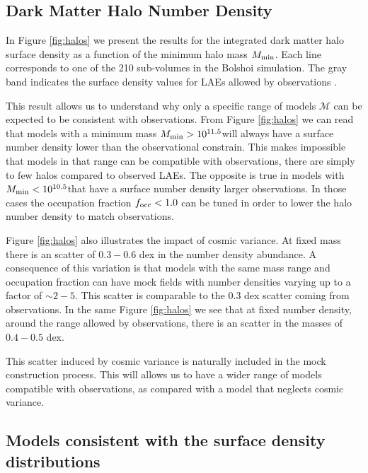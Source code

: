 \documentclass[usenatbib]{mn2e}
\newcommand{\hMsun}{{\ifmmode{h^{-1}{\rm
        {M_{\odot}}}}\else{$h^{-1}{\rm{M_{\odot}}}$}\fi}}
\begin{document}
\subsection{Dark Matter Halo Number Density}

In Figure \ref{fig:halos} we present the results for  the
integrated dark matter halo surface density as a function of the
minimum halo mass $M_{\rm min}$. Each line corresponds to one of the
210 sub-volumes in the Bolshoi simulation. The gray band indicates the
surface density values for LAEs allowed by observations
\citep{Yamada2012}. 
 
This result allows us to understand why only a specific range of
models ${\mathcal M}$ can be expected to be consistent with
observations. From Figure \ref{fig:halos} we can read that models with
a minimum mass $M_{\rm min}>10^{11.5}$\hMsun will always have a
surface number density lower than the observational constrain. This
makes impossible that models in that range can be compatible with
observations, there are simply to few halos compared to observed
LAEs. The opposite is true in models with $M_{\rm
  min}<10^{10.5}$\hMsun that have a surface number density larger
observations. In those cases the occupation fraction $f_{\rm occ}<1.0$
can be tuned in order to lower the halo number density to match
observations.  


Figure \ref{fig:halos} also illustrates the impact of cosmic
variance. At fixed mass there is an scatter of $0.3-0.6$ dex in the
number density abundance.  A consequence of this variation is that
models with the same mass range and occupation fraction can have mock
fields with number densities varying up to a factor of $\sim
2-5$. This scatter is comparable to the $0.3$ dex scatter coming from 
observations. In the same Figure \ref{fig:halos} we see that at fixed
number density, around the range allowed by observations, there is an
scatter in the masses of $0.4-0.5$ dex.  

This scatter induced by cosmic variance is naturally included in the
mock construction process. This will allows us to have a wider range
of models compatible with observations, as compared with a model that
neglects cosmic variance.


\subsection{Models consistent with the surface density distributions}
\end{document}
